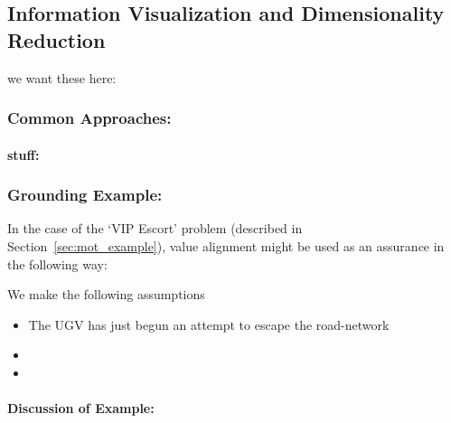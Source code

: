\subsection{Information Visualization and Dimensionality Reduction} \label{sec:vis_dr}
we want these here: \citet{Correa2009-hi, Sacha2017-hf, Lyons2017-mh, Chipman2005-om, Venna2007-yj, Vellido2012-nm, Chadalavada2015-wx, Hutchins2015-if}

\subsubsection{Common Approaches:}

\paragraph{stuff:}


\subsubsection{Grounding Example:}
In the case of the `VIP Escort' problem (described in Section~\ref{sec:mot_example}), value alignment might be used as an assurance in the following way:

We make the following assumptions

\begin{itemize}
    \item The UGV has just begun an attempt to escape the road-network
    \item 
    \item 
\end{itemize}

\paragraph{\textbf{Discussion of Example:}} 
